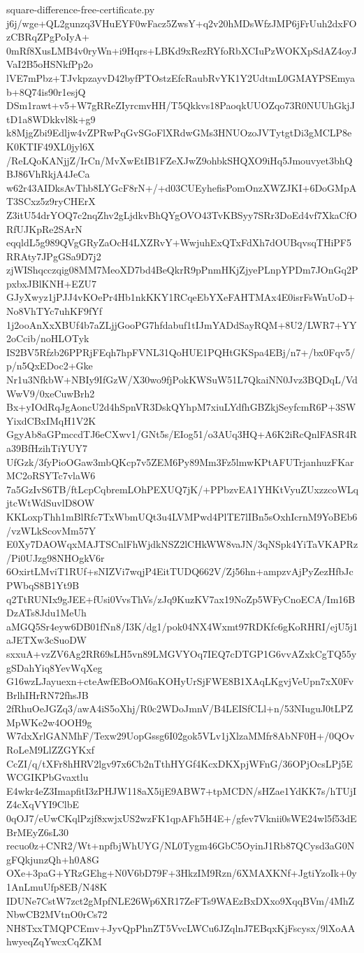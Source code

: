 \documentclass[11pt]{article}
\theoremstyle{definition}
\theoremstyle{remark}
\begin{document}
\begin{filecontents*}[overwrite]{square-difference-free-certificate.py}
j6j/wge+QL2gunzq3VHuEYF0wFacz5ZwsY+q2v20hMDsWfzJMP6jFrUuh2dxFOzCBRqZPgPoIyA+
0mRf8XusLMB4v0ryWn+i9Hqrs+LBKd9xRezRYfoRbXCIuPzWOKXpSdAZ4oyJVaI2B5oHSNkfPp2o
lVE7mPbz+TJvkpzayvD42byfPTOstzEfcRaubRvYK1Y2UdtmL0GMAYPSEmyab+8Q74is90r1esjQ
DSm1rawt+v5+W7gRReZIyrcmvHH/T5Qkkvs18PaoqkUUOZqo73R0NUUhGkjJtD1a8WDkkvl8k+g9
k8MjgZbi9Edljw4vZPRwPqGvSGoFlXRdwGMs3HNUOzoJVTytgtDi3gMCLP8eK0KTIF49XL0jyl6X
/ReLQoKANjjZ/IrCn/MvXwEtIB1FZeXJwZ9ohbkSHQXO9iHq5Jmouvyet3bhQBJ86VhRkjA4JeCa
w62r43AIDksAvThb8LYGcF8rN+/+d03CUEyhefisPomOnzXWZJKI+6DoGMpAT3SCxz5z9ryCHErX
Z3itU54drYOQ7c2nqZhv2gLjdkvBhQYgOVO43TvKBSyy7SRr3DoEd4vf7XkaCfORfUJKpRe2SArN
eqqldL5g989QVgGRyZaOcH4LXZRvY+WwjuhExQTxFdXh7dOUBqvsqTHiPF5RRAty7JPgGSa9D7j2
zjWIShqcczqig08MM7MeoXD7bd4BeQkrR9pPnmHKjZjyePLnpYPDm7JOnGq2PpxbxJBlKNH+EZU7
GJyXwyz1jPJJ4vKOePr4Hb1nkKKY1RCqeEbYXeFAHTMAx4E0isrFsWnUoD+No8VhTYc7uhKF9fYf
1j2ooAnXxXBUf4b7aZLjjGooPG7hfdabuf1tIJmYADdSayRQM+8U2/LWR7+YY2oCcib/noHLOTyk
IS2BV5Rfzb26PPRjFEqh7hpFVNL31QoHUE1PQHtGKSpa4EBj/n7+/bx0Fqv5/p/n5QxEDoc2+Gke
Nr1u3NfkbW+NBIy9IfGzW/X30wo9fjPokKWSuW51L7QkaiNN0Jvz3BQDqL/VdWwV9/0xeCuwBrh2
Bx+yIOdRqJgAoncU2d4hSpnVR3DskQYhpM7xiuLYdfhGBZkjSeyfcmR6P+3SWYixdCBxIMqH1V2K
GgyAb8aGPmccdTJ6eCXwv1/GNt5s/EIog51/o3AUq3HQ+A6K2iRcQnlFASR4Ra39BfHzihTiYUY7
UfGzk/3fyPioOGaw3mbQKcp7v5ZEM6Py89Mm3Fz5lmwKPtAFUTrjanhuzFKarMC2oRSYTc7vlaW6
7a5GzIvS6TB/ftLcpCqbremLOhPEXUQ7jK/+PPbzvEA1YHKtVyuZUxzzcoWLqjtcWtWdSuvlD8OW
KKLoxpThh1mBlRfc7TxWbmUQt3u4LVMPwd4PlTE7lIBn5sOxhIcrnM9YoBEb6/vzWLkScovMm57Y
E0Xy7DAOWqxMAJTSCnlFhWjdkNSZ2lCHkWW8vaJN/3qNSpk4YiTaVKAPRz/Pi0UJzg98NHOgkV6r
6OxirtLMviT1RUf+sNIZVi7wqjP4EitTUDQ662V/Zj56hn+ampzvAjPyZezHfbJcPWbqS8B1Yt9B
q2TtRUNIx9gJEE+fUsi0VvsThVs/zJq9KuzKV7ax19NoZp5WFyCnoECA/Im16BDzATs8Jdu1MeUh
aMGQ5Sr4eyw6DB01fNn8/I3K/dg1/pok04NX4Wxmt97RDKfc6gKoRHRI/ejU5j1aJETXw3cSuoDW
sxxuA+vzZV6Ag2RR69sLH5vn89LMGVYOq7IEQ7cDTGP1G6vvAZxkCgTQ55ygSDahYiq8YevWqXeg
G16wzLJayuexn+cteAwfEBoOM6aKOHyUrSjFWE8B1XAqLKgvjVeUpn7xX0FvBrlhIHrRN72fhsJB
2fRhuOeJGZq3/awA4iS5oXhj/R0c2WDoJmnV/B4LEISfCLl+n/53NIuguJ0tLPZMpWKe2w4OOH9g
W7dxXrlGANMhF/Texw29UopGssg6I02gok5VLv1jXlzaMMfr8AbNF0H+/0QOvRoLeM9LlZZGYKxf
CcZI/q/tXFr8hHRV2lgv97x6Cb2nTthHYGf4KcxDKXpjWFnG/36OPjOcsLPj5EWCGIKPbGvaxtlu
E4wkr4eZ3ImapfitI3zPHJW118aX5ijE9ABW7+tpMCDN/sHZae1YdKK7s/hTUjIZ4cXqVYI9ClbE
0qOJ7/eUwCKqlPzjf8xwjxUS2wzFK1qpAFh5H4E+/gfev7Vknii0sWE24wl5f53dEBrMEyZ6sL30
recuo0z+CNR2/Wt+npfbjWhUYG/NL0Tygm46GbC5OyinJ1Rb87QCysd3aG0NgFQkjunzQh+h0A8G
OXe+3paG+YRzGEhg+N0V6bD79F+3HkzIM9Rzn/6XMAXKNf+JgtiYzoIk+0y1AnLmuUfp8EB/N48K
IDUNe7CstW7zct2gMpfNLE26Wp6XR17ZeFTs9WAEzBxDXxo9XqqBVm/4MhZNbwCB2MVtnO0rCs72
NH8TxxTMQPCEmv+JyvQpPhnZT5VvcLWCu6JZqlnJ7EBqxKjFscysx/9lXoAAhwyeqZqYwcxCqZKM

\end{filecontents*}
\end{document}
